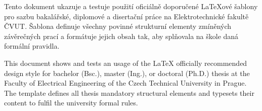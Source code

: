 \startAbstractCz
Tento dokument ukazuje a testuje použití oficiálně doporučené \LaTeX{}ové šablony
\FelThesis{} pro sazbu bakalářské, diplomové a disertační práce na
Elektrotechnické fakultě ČVUT. Šablona definuje všechny povinné
strukturní elementy zmíněných závěrečných prací a formátuje jejich
obsah tak, aby splňovala na škole daná formální pravidla.
\stopAbstractCz

\startAbstractEn
This document shows and tests an usage of the \LaTeX{} officially
recommended design style \FelThesis{} for bachelor (Bsc.), master
(Ing.), or doctoral (Ph.D.) thesis at the Faculty of Electrical
Engineering of the Czech Technical University in Prague.
The template defines all thesis mandatory structural elements and
typesets their content to fulfil the university formal rules.
\stopAbstractEn

\endinput
